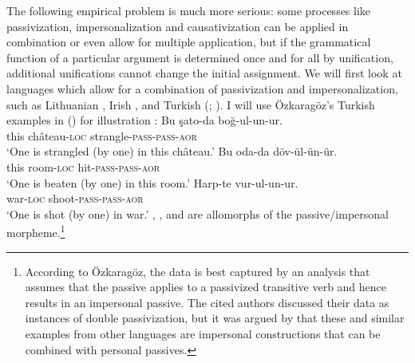 The following empirical problem is much more serious: some processes like passivization, impersonalization and
causati\-vization can be applied in combination or even allow for multiple application, but if the grammatical function of a particular
argument is determined once and for all by unification, additional unifications cannot change the
initial assignment. 
We will first look at languages which allow for a combination of passivization
and impersonalization, such as Lithuanian \citep[Section~5]{Timberlake82a}, Irish \citep{Noonan94a}, and Turkish (\citealp{Ozkaragoez86a};
\citealp[Section~2.3.3]{Knecht85a-u}).  I will use Özkaragöz's Turkish examples in () for
illustration \citeyearpar[]{Ozkaragoez86a}:
\eal\label{ex-double-passivization}
\ex\label{ex-double-passivization-strangle}
\gll Bu şato-da boğ-ul-un-ur.\\
     this château-\textsc{loc} strangle-\textsc{pass}-\textsc{pass}-\textsc{aor}\\
\glt `One is strangled (by one) in this château.'
\ex\label{ex-double-passivization-hit}
\gll Bu oda-da döv-ül-ün-ür.\\
     this room-\textsc{loc} hit-\textsc{pass}-\textsc{pass}-\textsc{aor}\\
\glt `One is beaten (by one) in this room.'
\ex
\gll Harp-te vur-ul-un-ur.\\
     war-\textsc{loc} shoot-\textsc{pass}-\textsc{pass}-\textsc{aor}\\
\glt `One is shot (by one) in war.'
\zl
{}, , and  are allomorphs of the passive/impersonal morpheme.\footnote{According to
Özkara\-göz, the data is best captured by an analysis that assumes that the passive applies to a
passivized transitive verb and hence results in an impersonal passive. The cited authors discussed their data as instances of double passivization, but it was
argued by \citet{Blevins2003a} that these and similar examples from other languages are impersonal
constructions that can be combined with personal passives.}

